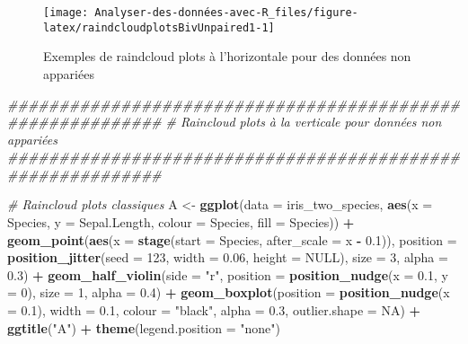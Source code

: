 \documentclass[
  french,
]{book}
\newenvironment{Shaded}{\begin{snugshade}}{\end{snugshade}}
\newcommand{\CommentTok}[1]{\textcolor[rgb]{0.56,0.35,0.01}{\textit{#1}}}
\newcommand{\DataTypeTok}[1]{\textcolor[rgb]{0.13,0.29,0.53}{#1}}
\newcommand{\DecValTok}[1]{\textcolor[rgb]{0.00,0.00,0.81}{#1}}
\newcommand{\FloatTok}[1]{\textcolor[rgb]{0.00,0.00,0.81}{#1}}
\newcommand{\KeywordTok}[1]{\textcolor[rgb]{0.13,0.29,0.53}{\textbf{#1}}}
\newcommand{\NormalTok}[1]{#1}
\newcommand{\OperatorTok}[1]{\textcolor[rgb]{0.81,0.36,0.00}{\textbf{#1}}}
\newcommand{\OtherTok}[1]{\textcolor[rgb]{0.56,0.35,0.01}{#1}}
\newcommand{\StringTok}[1]{\textcolor[rgb]{0.31,0.60,0.02}{#1}}
\begin{document}
\begin{figure}

{\centering \texttt{[image: Analyser-des-données-avec-R\_files/figure-latex/raindcloudplotsBivUnpaired1-1]} 

}

\caption{Exemples de raindcloud plots à l'horizontale pour des données non appariées}\label{fig:raindcloudplotsBivUnpaired1}
\end{figure}

\begin{Shaded}
\begin{Highlighting}[]
\CommentTok{###########################################################}
\CommentTok{# Raincloud plots à la verticale pour données non appariées}
\CommentTok{###########################################################}

\CommentTok{# Raincloud plots classiques}
\NormalTok{A <-}
\StringTok{  }\KeywordTok{ggplot}\NormalTok{(}\DataTypeTok{data =}\NormalTok{ iris_two_species, }\KeywordTok{aes}\NormalTok{(}\DataTypeTok{x =}\NormalTok{ Species, }\DataTypeTok{y =}\NormalTok{ Sepal.Length, }
                                      \DataTypeTok{colour =}\NormalTok{ Species, }\DataTypeTok{fill =}\NormalTok{ Species)) }\OperatorTok{+}
\StringTok{  }\KeywordTok{geom_point}\NormalTok{(}\KeywordTok{aes}\NormalTok{(}\DataTypeTok{x =} \KeywordTok{stage}\NormalTok{(}\DataTypeTok{start =}\NormalTok{ Species, }\DataTypeTok{after_scale =}\NormalTok{ x }\OperatorTok{-}\StringTok{ }\FloatTok{0.1}\NormalTok{)),}
             \DataTypeTok{position =} \KeywordTok{position_jitter}\NormalTok{(}\DataTypeTok{seed =} \DecValTok{123}\NormalTok{, }\DataTypeTok{width =} \FloatTok{0.06}\NormalTok{, }\DataTypeTok{height =} \OtherTok{NULL}\NormalTok{),}
             \DataTypeTok{size =} \DecValTok{3}\NormalTok{, }\DataTypeTok{alpha =} \FloatTok{0.3}\NormalTok{) }\OperatorTok{+}
\StringTok{  }\KeywordTok{geom_half_violin}\NormalTok{(}\DataTypeTok{side =} \StringTok{"r"}\NormalTok{,}
                   \DataTypeTok{position =} \KeywordTok{position_nudge}\NormalTok{(}\DataTypeTok{x =} \FloatTok{0.1}\NormalTok{, }\DataTypeTok{y =} \DecValTok{0}\NormalTok{),}
                   \DataTypeTok{size =} \DecValTok{1}\NormalTok{, }\DataTypeTok{alpha =} \FloatTok{0.4}\NormalTok{) }\OperatorTok{+}
\StringTok{  }\KeywordTok{geom_boxplot}\NormalTok{(}\DataTypeTok{position =} \KeywordTok{position_nudge}\NormalTok{(}\DataTypeTok{x =} \FloatTok{0.1}\NormalTok{),}
               \DataTypeTok{width =} \FloatTok{0.1}\NormalTok{, }\DataTypeTok{colour =} \StringTok{"black"}\NormalTok{, }\DataTypeTok{alpha =} \FloatTok{0.3}\NormalTok{, }\DataTypeTok{outlier.shape =} \OtherTok{NA}\NormalTok{) }\OperatorTok{+}
\StringTok{  }\KeywordTok{ggtitle}\NormalTok{(}\StringTok{"A"}\NormalTok{) }\OperatorTok{+}
\StringTok{  }\KeywordTok{theme}\NormalTok{(}\DataTypeTok{legend.position =} \StringTok{"none"}\NormalTok{)}


\end{Highlighting}
\end{Shaded}
\end{document}
